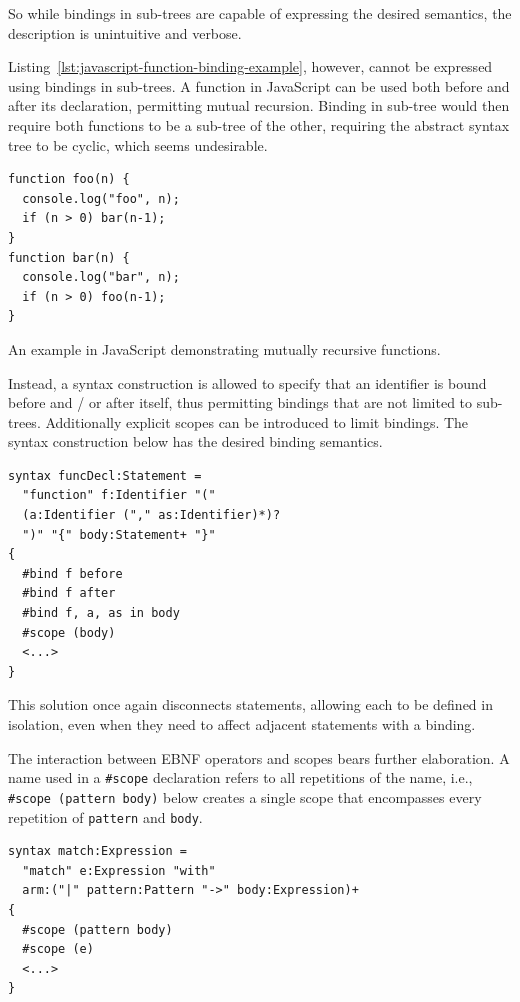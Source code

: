 \documentclass{kththesis}
\begin{document}
So while bindings in sub-trees are capable of expressing the desired semantics, the description is unintuitive and verbose.

Listing~\ref{lst:javascript-function-binding-example}, however, cannot be expressed using bindings in sub-trees. A function in JavaScript can be used both before and after its declaration, permitting mutual recursion. Binding in sub-tree would then require both functions to be a sub-tree of the other, requiring the abstract syntax tree to be cyclic, which seems undesirable.

\begin{listing}
\begin{verbatim}
function foo(n) {
  console.log("foo", n);
  if (n > 0) bar(n-1);
}
function bar(n) {
  console.log("bar", n);
  if (n > 0) foo(n-1);
}
\end{verbatim}
\caption{An example in JavaScript demonstrating mutually recursive functions.}
\label{lst:javascript-function-binding-example}
\end{listing}

Instead, a syntax construction is allowed to specify that an identifier is bound before and / or after itself, thus permitting bindings that are not limited to sub-trees. Additionally explicit scopes can be introduced to limit bindings. The syntax construction below has the desired binding semantics.

\begin{verbatim}
syntax funcDecl:Statement =
  "function" f:Identifier "("
  (a:Identifier ("," as:Identifier)*)?
  ")" "{" body:Statement+ "}"
{
  #bind f before
  #bind f after
  #bind f, a, as in body
  #scope (body)
  <...>
}
\end{verbatim}

This solution once again disconnects statements, allowing each to be defined in isolation, even when they need to affect adjacent statements with a binding.

The interaction between EBNF operators and scopes bears further elaboration. A name used in a \texttt{#scope} declaration refers to all repetitions of the name, i.e., \texttt{#scope (pattern body)} below creates a single scope that encompasses every repetition of \texttt{pattern} and \texttt{body}.

\begin{verbatim}
syntax match:Expression =
  "match" e:Expression "with"
  arm:("|" pattern:Pattern "->" body:Expression)+
{
  #scope (pattern body)
  #scope (e)
  <...>
}
\end{verbatim}
\end{document}
